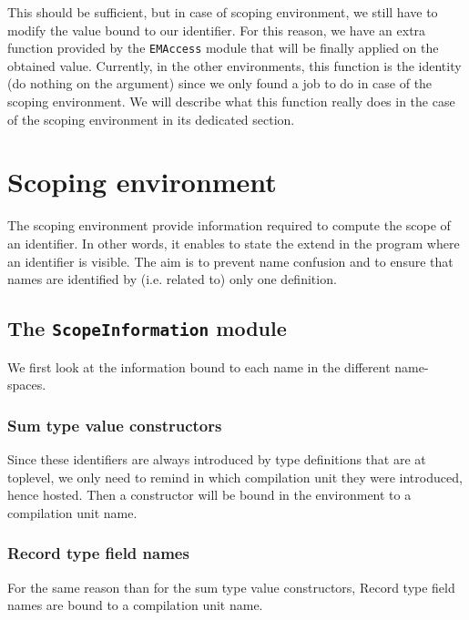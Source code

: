 \begin{enumerate}
\begin{enumerate}
    This should be sufficient, but in case of scoping environment, we
    still have to modify the value bound to our identifier. For this
    reason, we have an extra function provided by the {\tt EMAccess}
    module that will be finally applied on the obtained
    value. Currently, in the other environments, this function is the
    identity (do nothing on the argument) since we only found a job to
    do in case of the scoping environment. We will describe what this
    function really does in the case of the scoping environment in its
    dedicated section.
  \end{enumerate}
\end{enumerate}


\section{Scoping environment}
The scoping environment provide information required to compute the
scope of an identifier. In other words, it enables to state the extend
in the program where an identifier is visible. The aim is to prevent
name confusion and to ensure that names are identified by
(i.e. related to) only one definition.

\subsection{The {\tt ScopeInformation} module}
We first look at the information bound to each name in the different
name-spaces.

\subsubsection{Sum type value constructors}
Since these identifiers are always introduced by type definitions that
are at toplevel, we only need to remind in which compilation unit they
were introduced, hence hosted. Then a constructor will be bound in the
environment to a compilation unit name.

\subsubsection{Record type field names}
For the same reason than for the sum type value constructors, Record
type field names are bound to a compilation unit name.

